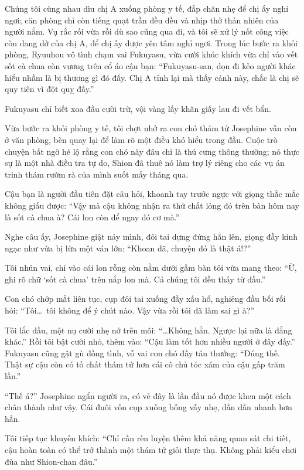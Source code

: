 \documentclass[../main.tex]{subfiles}
\begin{document}
\ct

Chúng tôi cùng nhau dìu chị A xuống phòng y tế, đắp chăn nhẹ để chị ấy nghỉ ngơi; căn phòng chỉ còn tiếng quạt trần đều đều và nhịp thở thản nhiên của người nằm. Vụ rắc rối vừa rồi dù sao cũng qua đi, và tôi sẽ xử lý nốt công việc còn dang dở của chị A, để chị ấy được yên tâm nghỉ ngơi. Trong lúc bước ra khỏi phòng, Ryuuhou vô tình chạm vai Fukuyasu, vừa cười khúc khích vừa chỉ vào vết sốt cà chua còn vương trên cổ áo cậu bạn: ``Fukuyasu-san, dọn đi kẻo người khác hiểu nhầm là bị thương gì đó đấy. Chị A tỉnh lại mà thấy cảnh này, chắc là chị sẽ quy tiên vì đột quỵ đấy.''

Fukuyasu chỉ biết xoa đầu cười trừ, vội vàng lấy khăn giấy lau đi vết bẩn.

Vừa bước ra khỏi phòng y tế, tôi chợt nhớ ra con chó thám tử Josephine vẫn còn ở văn phòng, bèn quay lại để làm rõ một điều khó hiểu trong đầu. Cuộc trò chuyện bất ngờ hé lộ rằng con chó này đâu chỉ là thú cưng thông thường; nó thực sự là một nhà điều tra tự do, Shion đã thuê nó làm trợ lý riêng cho các vụ án trinh thám rườm rà của mình suốt mấy tháng qua.

Cậu bạn là người đầu tiên đặt câu hỏi, khoanh tay trước ngực với giọng thắc mắc không giấu được: ``Vậy mà cậu không nhận ra thứ chất lỏng đỏ trên bàn hôm nay là sốt cà chua à? Cái lon còn để ngay đó cơ mà.''

Nghe câu ấy, Josephine giật nảy mình, đôi tai dựng đứng hẳn lên, giọng đầy kinh ngạc như vừa bị lừa một ván lớn: ``Khoan đã, chuyện đó là thật á!?''

Tôi nhún vai, chỉ vào cái lon rỗng còn nằm dưới gầm bàn tôi vừa mang theo: ``Ừ, ghi rõ chữ `sốt cà chua' trên nắp lon mà. Cả chúng tôi đều thấy từ đầu.''

Con chó chớp mắt liên tục, cụp đôi tai xuống đầy xấu hổ, nghiêng đầu bối rối hỏi: ``Tôi\dots\ tôi không để ý chút nào. Vậy vừa rồi tôi đã làm sai gì à?''

Tôi lắc đầu, một nụ cười nhẹ nở trên môi: ``\dots Không hẳn. Ngược lại nữa là đằng khác.'' Rồi tôi bật cười nhỏ, thêm vào: ``Cậu làm tốt hơn nhiều người ở đây đấy.'' Fukuyasu cũng gật gù đồng tình, vỗ vai con chó đầy tán thưởng: ``Đúng thế. Thật sự cậu còn có tố chất thám tử hơn cái cô chủ tóc xám của cậu gấp trăm lần.''

``Thế á?'' Josephine ngẩn người ra, có vẻ đây là lần đầu nó được khen một cách chân thành như vậy. Cái đuôi vốn cụp xuống bỗng vẫy nhẹ, dần dần nhanh hơn hẳn.

Tôi tiếp tục khuyến khích: ``Chỉ cần rèn luyện thêm khả năng quan sát chi tiết, cậu hoàn toàn có thể trở thành một thám tử giỏi thực thụ. Không phải kiểu chơi đùa như Shion-chan đâu.''
\end{document}
